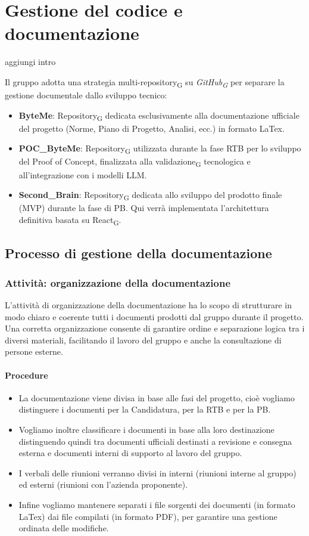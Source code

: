 \documentclass[11pt,a4paper]{article}
\newcommand{\gls}[1]{#1\textsubscript{G}}
\begin{document}
\section{Gestione del codice e documentazione}
aggiungi intro

Il gruppo adotta una strategia multi-\gls{repository} su \textit{\gls{GitHub}} per separare la gestione documentale dallo sviluppo tecnico:
\begin{itemize}
    \item \textbf{ByteMe}: \gls{Repository} dedicata esclusivamente alla documentazione ufficiale del progetto (Norme, Piano di Progetto, Analisi, ecc.) in formato LaTex.
    \item \textbf{POC\_ByteMe}: \gls{Repository} utilizzata durante la fase RTB per lo sviluppo del Proof of Concept, finalizzata alla \gls{validazione} tecnologica e all'integrazione con i modelli LLM.
    \item \textbf{Second\_Brain}: \gls{Repository} dedicata allo sviluppo del prodotto finale (MVP) durante la fase di PB. Qui verrà implementata l'architettura definitiva basata su \gls{React}.
\end{itemize}

\subsection{Processo di gestione della documentazione}

\subsubsection{Attività: organizzazione della documentazione}
L’attività di organizzazione della documentazione ha lo scopo di strutturare in modo chiaro e coerente tutti i documenti prodotti dal gruppo durante il progetto.
Una corretta organizzazione consente di garantire ordine e separazione logica tra i diversi materiali, facilitando il lavoro del gruppo e anche la consultazione di persone esterne.

\paragraph{Procedure}
\begin{itemize}
    \item La documentazione viene divisa in base alle fasi del progetto, cioè vogliamo distinguere i documenti per la Candidatura, per la RTB e per la PB.
    \item Vogliamo inoltre classificare i documenti in base alla loro destinazione distinguendo quindi tra documenti ufficiali destinati a revisione e consegna esterna e documenti interni di supporto al lavoro del gruppo.
    \item I verbali delle riunioni verranno divisi in interni (riunioni interne al gruppo) ed esterni (riunioni con l'azienda proponente).
    \item Infine vogliamo mantenere separati i file sorgenti dei documenti (in formato LaTex) dai file compilati (in formato PDF), per garantire una gestione ordinata delle modifiche.
\end{itemize}
\end{document}

